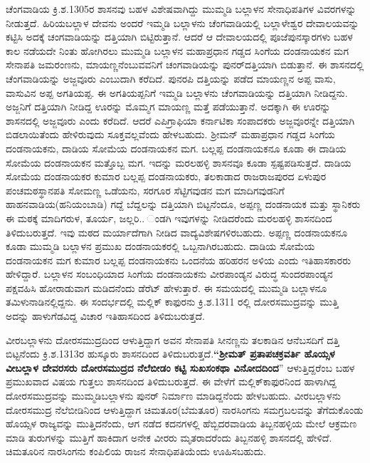ಚೆಂಗವಾಡಿಯ ಕ್ರಿ.ಶ.1305ರ ಶಾಸನವು ಬಹಳ ವಿಶೇಷವಾಗಿದ್ದು ಮುಮ್ಮಡಿ ಬಲ್ಲಾಳನ ಸೇನಾಧಿಪತಿಗಳ ವಿವರಗಳನ್ನು ನೀಡುತ್ತದೆ. ಹಿರಿಯಬಲ್ಲಾಳ ದೇವನು ಅಂದರೆ ಇಮ್ಮಡಿ ಬಲ್ಲಾಳನು ಚೆಂಗವಾಡಿಯಲ್ಲಿ ಬಲ್ಲಾಳೇಶ್ವರ ದೇವಾಲಯವನ್ನು ಕಟ್ಟಿಸಿ ಅದಕ್ಕೆ ಚಂಗವಾಡಿಯನ್ನು ದತ್ತಿಯಾಗಿ ಬಿಟ್ಟಿರುತ್ತಾನೆ. ಆದರೆ ಆ ದೇವಾಲಯದಲ್ಲಿ ಪೂಜೆಪುನಸ್ಕಾರಗಳು ಬಹಳ ಕಾಲ ನಡೆಯದೇ ನಿಂತು ಹೋಗಿರಲು ಮುಮ್ಮಡಿ ಬಲ್ಲಾಳನ ಮಹಾಪ್ರಧಾನ ಗಡ್ಡದ ಸಿಂಗೆಯ ದಂಡನಾಯಕನ ಮಗ ಸೇನಾಪತಿ ಜಮರಂಣನು, ಮಾಯಣ್ಣನೆಂಬುವವನಿಗೆ ಚಂಗವಾಡಿಯನ್ನು ಪುನರ್​ದತ್ತಿಯಾಗಿ ಬಿಡುತ್ತಾನೆ. ಈ ಶಾಸನದಲ್ಲಿ ಚೆಂಗವಾಡಿಯನ್ನು ಅಜ್ಜವೂರು ಎಂಬುದಾಗಿ ಕರೆದಿದೆ. ಪುನರಪಿ ದತ್ತಿಯನ್ನು ಪಡೆದ ಮಾಯಣ್ಣನ ಅಪ್ಪ ವಾಸು, ವಾಸುವಿನ ಅಪ್ಪ ಅಗತಿಯಪ್ಪ. ಈ ಅಗತಿಯಪ್ಪನಿಗೆ ಇಮ್ಮಡಿ ಬಲ್ಲಾಳನು ಚೆಂಗವಾಡಿಯನ್ನು ದತ್ತಿಯಾಗಿ ನೀಡಿದ್ದನು. ಅಜ್ಜನಿಗೆ ದತ್ತಿಯಾಗಿ ನೀಡಿದ್ದ ಊರನ್ನು ಮೊಮ್ಮಗ ಮಾಯಣ್ಣ ಮತ್ತೆ ಪಡೆಯುತ್ತಾನೆ. ಅದಕ್ಕಾಗಿ ಈ ಊರನ್ನು ಶಾಸನದಲ್ಲಿ ಅಜ್ಜವೂರು ಎಂದು ಕರೆದಿದೆ. ಆದರೆ ಎಪಿಗ್ರಾಫಿಯಾ ಕರ್ನಾಟಿಕಾ ಸಂಪಾದಕರು ಅಜ್ಜವೂರನ್ನೇ ದತ್ತಿಯಾಗಿ ಬಿಡಲಾಯಿತೆಂದು ಹೇಳಿರುವುದು ಸೂಕ್ತವಲ್ಲವೆಂದು ಹೇಳಬಹುದು. ಶ‍್ರೀಮನ್​ ಮಹಾಪ್ರಧಾನ ಗಡ್ಡದ ಸಿಂಗೆಯ ದಂಡನಾಯಕನು, ದಾಡಿಯ ಸೋಮೆಯ ದಂಡನಾಯಕನ ಮಗ. ಬಲ್ಲಪ್ಪ ದಂಡನಾಯಕನೂ ಕೂಡಾ ಈ ದಾಡಿಯ ಸೋಮೆಯ ದಂಡನಾಯಕನ ಮತ್ತೊಬ್ಬ ಮಗ. ಇದನ್ನು ಮರಲಹಳ್ಳಿ ಶಾಸನವೂ ಕೂಡಾ ಸ್ಪಷ್ಟಪಡಿಸುತ್ತದೆ. ದಾಡಿಯ ಸೋಮೆಯ ದಂಡನಾಯಕರ ಕುಮಾರ ಬಲ್ಲಪ್ಪ ದಂಡನಾಯಕರು, ತಲಕಾಡಾದ ರಾಜರಾಜಪುರದ ಏಳುಪುರ ಪಂಚಮಠಸ್ಥಾನಪತಿ ಸೋಮಣ್ಣ ಒಡೆಯನು, ಸರಗೂರ ಸೆಟ್ಟಿಗವುಡನ ಮಗ ಮಾದಿಗವುಡನಿಗೆ ಹಾಹನವಾಡಿಯ(ಹನಿಯಂಬಾಡಿ) ಗದ್ದೆ ಬೆದ್ದಲನ್ನು ದತ್ತಿಯಾಗಿ ಬಿಟ್ಟನೆಂದೂ, ಅಪ್ಪಣ್ಣ ದಂಡನಾಯಕ ಮತ್ತು ಸ್ಥಾನಿಕರು ಈ ಮಠಕ್ಕೆ ಮಾದಿಗರುಳ, ತೂರ್ಯ, ಜಲ್ಲರಿ.. ಂಡಗಿ ಇವುಗಳನ್ನು ನೀಡಿದರೆಂದು ಮರಲಹಳ್ಳಿ ಶಾಸನದಿಂದ ತಿಳಿದುಬರುತ್ತದೆ. ಇವು ಮಠದ ಮರ್ಯಾದೆಗಾಗಿ ನೀಡಿದ ವಾದ್ಯವಿಶೇಷಗಳಿರಬಹುದು. ಅಪ್ಪಣ್ಣ ದಂಡನಾಯಕನೂ ಕೂಡಾ ಮುಮ್ಮಡಿ ಬಲ್ಲಾಳನ ಪ್ರಮುಖ ದಂಡನಾಯಕರಲ್ಲಿ ಒಬ್ಬನಾಗಿರಬಹುದು. ದಾಡಿಯ ಸೋಮೆಯ ದಂಡನಾಯಕನ ಮಗ ಕುಮಾರ ಬಲ್ಲಪ್ಪ ದಂಡನಾಯಕನು ಒಂದನೆಯ ಹರಿಹರನ ಅಳಿಯ ಎಂದು ಇತಿಹಾಸಕಾರರು ಹೇಳಿದ್ದಾರೆ. ಬಲ್ಲಾಳನ ಸಂಬಂಧಿಯಾದ ಸಿಂಗೆಯ ದಂಡನಾಯಕನು ವೀರಪಾಂಡ್ಯನ ವಿರುದ್ಧ ಸುಂದರಪಾಂಡ್ಯನ ಪಕ್ಷವಹಿಸಿ ಹೋರಾಡುವಾಗ ಮಡಿದನೆಂದು ಡೆರೆಟ್​ ಹೇಳುತ್ತಾರೆ. ಈ ಸಮಯದಲ್ಲಿ ಮುಮ್ಮಡಿ ಬಲ್ಲಾಳನೂ ತಮಿಳುನಾಡಿನಲ್ಲಿದ್ದನು. ಈ ಸಂದರ್ಭದಲ್ಲಿ ಮಲ್ಲಿಕ್​ ಕಾಫುರನು ಕ್ರಿ.ಶ.1311 ರಲ್ಲಿ ದೋರಸಮುದ್ರವನ್ನು ಮುತ್ತಿ ಅದನ್ನು ಹಾಳುಗೆಡವಿದ್ದ ವಿಚಾರ ಇತಿಹಾಸದಿಂದ ತಿಳಿದುಬರುತ್ತದೆ.

ವೀರಬಲ್ಲಾಳನು ದೋರಸಮುದ್ರದಿಂದ ಆಳುತ್ತಿದ್ದಾಗ ಅವನ ಸೇನಾಪತಿ ಸೀನಣ್ಣನು ತಲಕಾಡಿನ ಆನೆಬಸದಿಗೆ ದತ್ತಿ ಬಿಟ್ಟನೆಂದು ಕ್ರಿ.ಶ.1313ರ ಹುಸ್ಕೂರು ಶಾಸನದಿಂದ ತಿಳಿದುಬರುತ್ತದೆ.\textbf{“ಶ‍್ರೀಮತ್​ ಪ್ರತಾಪಚಕ್ರವರ್ತಿ ಹೊಯ್ಸಳ ವೀಬಲ್ಲಾಳ ದೇವರಸರು ದೋರಸಮುದ್ರದ ನೆಲೆಬೀಡಂ ಕಟ್ಟಿ ಸುಖಸಂಕಥಾ ವಿನೋದದಿಂದ}” ಆಳುತ್ತಿದ್ದರೆಂಬ ಬಹಳ ಪ್ರಮುಖ\-ವಾದ ವಿಷಯ ಗುತ್ತಲು ಶಾಸನದಿಂದ ತಿಳಿದುಬರುತ್ತದೆ. ಈ ವೇಳೆಗೆ ಮಲ್ಲಿಕ್​ಕಾಫುರನಿಂದ ಹಾಳಾಗಿದ್ದ ದೋರಸಮುದ್ರವನ್ನು ಮುಮ್ಮಡಿಬಲ್ಲಾಳನು ಪುನರ್​ ನಿರ್ಮಾಣ ಮಾಡಿದ್ದನೆಂದು ಹೇಳಬಹುದು. ವೀರಬಲ್ಲಾಳನು ದೋರಸಮುದ್ರ ನೆಲೆಬೀಡಿನಿಂದ ಆಳುತ್ತಿದ್ದಾಗ ಚಿಮತೂರ(ಬೆಮತೂರ) ನಾರಸಿಂಗನು ಸಮಗ್ರಬಲವನ್ನು ತೆಗೆದುಕೊಂಡು ಹೊಯ್ಸಳ ರಾಜ್ಯವನ್ನು ಮುತ್ತಿದನೆಂದು, ಆಗ ನಡೆದ ಕದನಗಳಲ್ಲಿ ಹೆಬ್ಬಿದರವಾಡಿಯ ತಿಬ್ಬನಹಳ್ಳಿಯ ಮೇಲೆ ಆಕ್ರಮಣ ಮಾಡಿ ತುರುಗಳನ್ನು ಮುತ್ತಿಗೆ ಹಾಕಿದಾಗ ಅನೇಕ ವೀರರು ಮೃತರಾದರೆಂದು ತಿಬ್ಬನಹಳ್ಳಿ ಶಾಸನದಲ್ಲಿ ಹೇಳಿದೆ. ಚಿಮತೂರಿನ ನಾರಸಿಂಗನು ಕಂಪಿಲಿಯ ರಾಜನ ಸೇನಾಧಿಪತಿಯೆಂದು ಊಹಿಸಬಹುದು.

